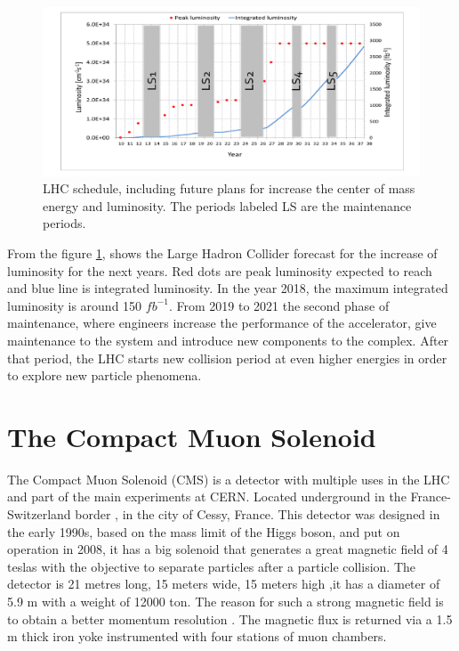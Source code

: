 \begin{figure}[!htbp]
\centering
\includegraphics[scale=0.5]{Chapter2/lum6.png}
\caption{LHC schedule, including future plans for increase the center of mass energy and luminosity. The periods labeled LS are the maintenance periods\cite{cern3}.}
\label{lhc-lumi}
\end{figure}
From the figure \ref{lhc-lumi}, shows the Large Hadron Collider forecast for the increase of luminosity for the next years. Red dots are peak luminosity expected to reach and blue line is integrated luminosity. In the year 2018, the maximum integrated luminosity is around 150 $fb^{-1}$\cite{cern3}. From 2019 to 2021 the second phase of maintenance, where engineers increase the performance of the accelerator, give maintenance to the system and introduce new components to the complex. After that period, the LHC starts new collision period at even higher energies in order to explore new particle phenomena.

\pagebreak

\section{The Compact Muon Solenoid}	
The Compact Muon Solenoid (CMS) is a detector with multiple uses in the LHC and part of the main experiments at CERN. Located underground in the France- Switzerland border , in the city of Cessy, France.
This detector was designed in the early 1990s, based on the mass limit of the Higgs boson,  and put on operation in 2008,  it has a big solenoid that generates a great magnetic field of 4 teslas with the objective to separate particles after a particle collision.
 The detector is 21 metres long, 15 meters wide, 15 meters high ,it has a diameter of 5.9 m with a weight of 12000 ton. The reason for such a strong magnetic field is to obtain a better momentum resolution .
 The magnetic flux is returned via a 1.5 m thick  iron yoke instrumented with four stations of muon
 chambers.



